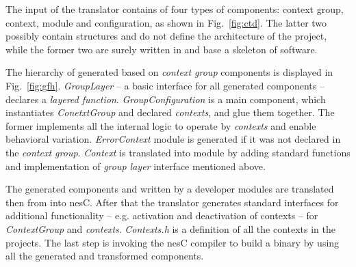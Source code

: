 The input of the translator contains of four types of components: context
group, context, module and configuration, as shown in
Fig.~\ref{fig:ctd}. The latter two possibly contain \conesc structures and do
not define the architecture of the project, while the former two are surely
written in \conesc and base a skeleton of software. 

The hierarchy of generated based on \emph{context group} components is displayed
in Fig.~\ref{fig:gfh}. \emph{GroupLayer} -- a basic interface for all generated
components -- declares a \emph{layered function}. \emph{GroupConfiguration} is a
main component, which instantiates \emph{ConetxtGroup} and declared
\emph{contexts}, and glue them together. The former implements all the internal
logic to operate by \emph{contexts} and enable behavioral variation.
\emph{ErrorContext} module is generated if it was not declared in the
\emph{context group}. \emph{Context} is translated into module by adding
standard functions and implementation of \emph{group layer} interface mentioned
above.

The generated components and written by a developer modules are translated then
from \conesc into nesC. After that the translator generates standard interfaces
for additional functionality -- e.g. activation and deactivation of contexts --
for \emph{ContextGroup} and \emph{contexts}. \emph{Contexts.h} is a definition
of all the contexts in the projects. The last step is invoking the nesC compiler
to build a binary by using all the generated and transformed components.
